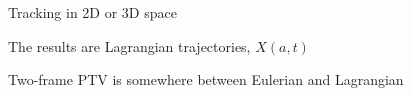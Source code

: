 \begin{frame}[label=ptv-12]{Tracking in 2D or 3D space}



\end{frame}





			

\begin{frame}[label=ptv-15]{The results are Lagrangian trajectories, $X(a,t)$}
    \centering
\end{frame}


\begin{frame}[label=ptv-16]{Two-frame PTV is somewhere between Eulerian and Lagrangian}
    \centering{}
\end{frame}


